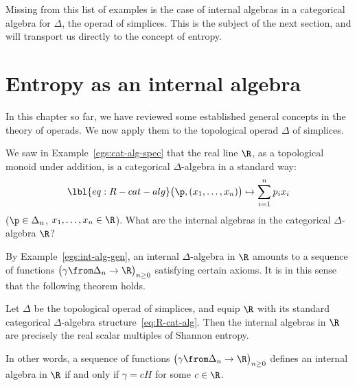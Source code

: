 Missing from this list of examples is the case of internal algebras in a
categorical algebra for $\Delta$, the operad of simplices.  This is the
subject of the next section, and will transport us directly to the concept
of entropy.


\section{Entropy as an internal algebra}


In this chapter so far, we have reviewed some established general
concepts in the theory of operads.  We now apply them to the topological
operad $\Delta$ of simplices.

We saw in Example~\ref{egs:cat-alg-spec} that
the real line $\R$, as a topological monoid under addition, is a
categorical $\Delta$-algebra in a standard way:
% 
\begin{equation}
\lbl{eq:R-cat-alg}
\bigl(\p, (x_1, \ldots, x_n)\bigr) \mapsto \sum_{i = 1}^n p_i x_i
\end{equation}
% 
($\p \in \Delta_n$, $x_1, \ldots, x_n \in \R$).  What are the internal
algebras in the categorical $\Delta$-algebra $\R$?

By Example~\ref{egs:int-alg-gen}, an internal
$\Delta$-algebra in $\R$ amounts to a sequence of functions $\bigl( \gamma
\from \Delta_n \to \R \bigr)_{n \geq 0}$ satisfying certain axioms.  It is
in this sense that the following theorem holds.

\begin{thm}
%
% 
Let $\Delta$ be the topological operad of simplices, and equip $\R$ with
its standard%
%
%
categorical $\Delta$-algebra structure~\eqref{eq:R-cat-alg}.
Then the internal algebras in $\R$ are precisely the real scalar multiples
of Shannon entropy.
\end{thm}

In other words, a sequence of functions $\bigl( \gamma \from \Delta_n \to
\R \bigr)_{n \geq 0}$ defines an internal algebra in $\R$ if and only if
$\gamma = cH$ for some $c \in \R$.

